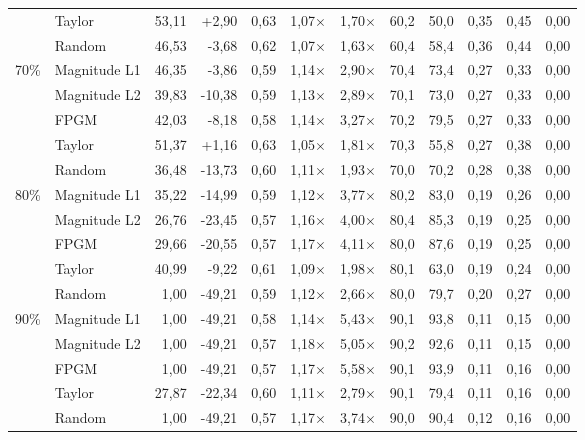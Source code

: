 \begin{table}[H]
{{\begin{tabular}{c l rr rrr rr rrr}
     & Taylor & 53,11 & +2,90 & 0,63 & 1,07$\times$ & 1,70$\times$ & 60,2 & 50,0 & 0,35 & 0,45 & 0,00 \\
     & Random & 46,53 & -3,68 & 0,62 & 1,07$\times$ & 1,63$\times$ & 60,4 & 58,4 & 0,36 & 0,44 & 0,00 \\
    \midrule
    \multirow{5}{*}{70\%} & Magnitude L1 & 46,35 & -3,86 & 0,59 & 1,14$\times$ & 2,90$\times$ & 70,4 & 73,4 & 0,27 & 0,33 & 0,00 \\
     & Magnitude L2 & 39,83 & -10,38 & 0,59 & 1,13$\times$ & 2,89$\times$ & 70,1 & 73,0 & 0,27 & 0,33 & 0,00 \\
     & FPGM & 42,03 & -8,18 & 0,58 & 1,14$\times$ & 3,27$\times$ & 70,2 & 79,5 & 0,27 & 0,33 & 0,00 \\
     & Taylor & 51,37 & +1,16 & 0,63 & 1,05$\times$ & 1,81$\times$ & 70,3 & 55,8 & 0,27 & 0,38 & 0,00 \\
     & Random & 36,48 & -13,73 & 0,60 & 1,11$\times$ & 1,93$\times$ & 70,0 & 70,2 & 0,28 & 0,38 & 0,00 \\
    \midrule
    \multirow{5}{*}{80\%} & Magnitude L1 & 35,22 & -14,99 & 0,59 & 1,12$\times$ & 3,77$\times$ & 80,2 & 83,0 & 0,19 & 0,26 & 0,00 \\
     & Magnitude L2 & 26,76 & -23,45 & 0,57 & 1,16$\times$ & 4,00$\times$ & 80,4 & 85,3 & 0,19 & 0,25 & 0,00 \\
     & FPGM & 29,66 & -20,55 & 0,57 & 1,17$\times$ & 4,11$\times$ & 80,0 & 87,6 & 0,19 & 0,25 & 0,00 \\
     & Taylor & 40,99 & -9,22 & 0,61 & 1,09$\times$ & 1,98$\times$ & 80,1 & 63,0 & 0,19 & 0,24 & 0,00 \\
     & Random & 1,00 & -49,21 & 0,59 & 1,12$\times$ & 2,66$\times$ & 80,0 & 79,7 & 0,20 & 0,27 & 0,00 \\
    \midrule
    \multirow{5}{*}{90\%} & Magnitude L1 & 1,00 & -49,21 & 0,58 & 1,14$\times$ & 5,43$\times$ & 90,1 & 93,8 & 0,11 & 0,15 & 0,00 \\
     & Magnitude L2 & 1,00 & -49,21 & 0,57 & 1,18$\times$ & 5,05$\times$ & 90,2 & 92,6 & 0,11 & 0,15 & 0,00 \\
     & FPGM & 1,00 & -49,21 & 0,57 & 1,17$\times$ & 5,58$\times$ & 90,1 & 93,9 & 0,11 & 0,16 & 0,00 \\
     & Taylor & 27,87 & -22,34 & 0,60 & 1,11$\times$ & 2,79$\times$ & 90,1 & 79,4 & 0,11 & 0,16 & 0,00 \\
     & Random & 1,00 & -49,21 & 0,57 & 1,17$\times$ & 3,74$\times$ & 90,0 & 90,4 & 0,12 & 0,16 & 0,00 \\
    \bottomrule
  \end{tabular}}}
\end{table}
